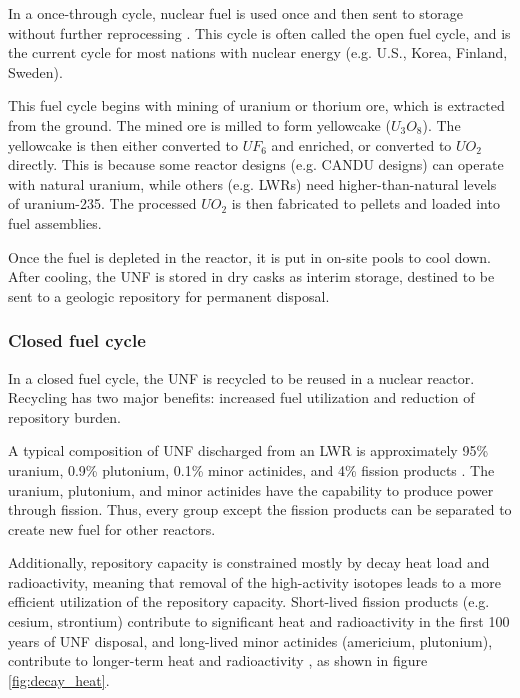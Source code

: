 In a once-through cycle, nuclear fuel is used once and then sent to
storage without further reprocessing \cite{tsoulfanidis_nuclear_2013}.
This cycle is often called the open fuel cycle, and is the current cycle for
most nations with nuclear energy (e.g. U.S., Korea, Finland, Sweden).

This fuel cycle begins with mining of uranium or thorium ore, which is extracted from the
ground. The mined ore is milled to form yellowcake ($U_3O_8$).
The yellowcake is then either converted to $UF_6$ and enriched, or converted
to $UO_2$ directly. This is because some reactor designs (e.g. \gls{CANDU} designs\cite{torgerson_candu_2006})
can operate with natural uranium, while others (e.g. \glspl{LWR}) need
higher-than-natural levels of uranium-235. The processed $UO_2$ is
then fabricated to pellets and loaded into fuel assemblies.

Once the fuel is depleted in the reactor, it is put in on-site pools to cool down.
After cooling, the \gls{UNF}
is stored in dry casks as interim storage, destined to be sent to a geologic repository
for permanent disposal.

\subsubsection{Closed fuel cycle}
In a closed fuel cycle, the \gls{UNF} is recycled to be reused
in a nuclear reactor. Recycling has two major
benefits: increased fuel utilization and reduction of repository
burden.

A typical composition of \gls{UNF} discharged from an \gls{LWR}
is approximately 95\% uranium, 0.9\% plutonium, 0.1\%
minor actinides, and 4\% fission products \cite{feiveson_spent_2011}.
The uranium, plutonium, and minor actinides have the capability
to produce power through fission. Thus, every group except the
fission products can be separated to create new fuel for other reactors.

Additionally, repository capacity is constrained mostly by decay heat
load and radioactivity, meaning that removal of the high-activity
isotopes leads to a more efficient utilization of the repository
capacity. Short-lived fission products (e.g. cesium, strontium) contribute
to significant heat and radioactivity in the first 100 years of \gls{UNF} disposal,
and long-lived minor actinides (americium, plutonium),
contribute to longer-term heat and radioactivity \cite{wigeland_separations_2006},
as shown in figure \ref{fig:decay_heat}.

